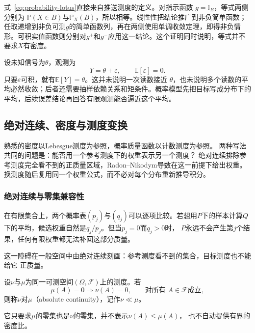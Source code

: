 式~\eqref{eq:probability-lotus}直接来自推送测度的定义。对指示函数
\(g=\mathbb{I}_B\)，等式两侧分别为
\(\mathbb{P}(X\in B)\)与\(\mathbb{P}_X(B)\)，所以相等。线性性把结论推广到非负简单函数；任取递增到非负可测\(g\)的简单函数列，再在两侧使用单调收敛定理，即得非负情形。可积实值函数则分别对\(g^+\)和\(g^-\)应用这一结论。这个证明同时说明，等式并不要求\(X\)有密度。

\begin{example}[带噪观测的平均目标]
\label{ex:probability-noisy-observation}
设未知信号为\(\theta\)，观测为
\[ Y=\theta+\varepsilon,
  \qquad\mathbb{E}[\varepsilon]=0. \]
只要\(\varepsilon\)可积，就有\(\mathbb{E}[Y]=\theta\)。这并未说明一次读数接近
\(\theta\)，也未说明多个读数的平均必然收敛；后者还需要抽样依赖关系和矩条件。概率模型先把目标写成分布下的平均，后续误差结论再回答有限观测能否逼近这个平均。
\end{example}

\subsection{绝对连续、密度与测度变换}
\label{sec:probability-radon-nikodym-change-measure}

熟悉的密度以Lebesgue测度为参照，概率质量函数以计数测度为参照。
两种写法共同的问题是：能否用一个参考测度下的权重表示另一个测度？
绝对连续排除参考测度完全看不到的正质量区域，Radon--Nikodym导数在这一前提下给出权重。
换测度随后复用同一个权重公式，而不必对每个分布重新推导积分。

\subsubsection{绝对连续与零集兼容性}

在有限集合上，两个概率表\((p_j)\)与\((q_j)\)可以逐项比较。若想用\(P\)下的样本计算\(Q\)下的平均，候选权重自然是\(q_j/p_j\)。但当\(p_j=0\)而\(q_j>0\)时，
\(P\)永远不会产生第\(j\)个结果，任何有限权重都无法补回这部分质量。

这一障碍在一般空间中由绝对连续刻画：参考测度看不到的集合，目标测度也不能给它
正质量。
\begin{definition}[测度的绝对连续]
\label{def:probability-absolute-continuity}
设\(\nu\)与\(\mu\)为同一可测空间\((\Omega,\mathcal{F})\)上的测度。若
\[ \mu(A)=0\Longrightarrow\nu(A)=0,
  \qquad\text{对所有 }A\in\mathcal{F}\text{成立}, \]
则称\(\nu\)对\(\mu\)（absolute continuity），记作\(\nu\ll\mu\)。
\end{definition}
它只要求\(\mu\)的零集也是\(\nu\)的零集，并不表示\(\nu(A)\leq\mu(A)\)，
也不自动提供有界的密度比。

